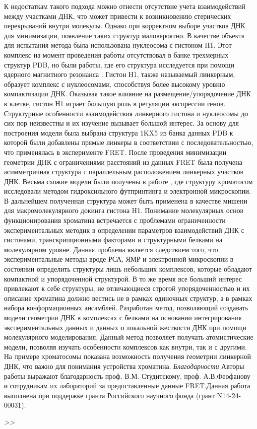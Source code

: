 К недостаткам такого подхода можно отнести отсутствие учета взаимодействий между участками ДНК, что может привести к возникновению стерических перекрываний внутри молекулы. Однако при корректном выборе участков ДНК для минимизации, появление таких структур маловероятно.
В качестве объекта для испытания метода была использована нуклеосома с гистоном H1. Этот комплекс на момент проведения работы отсутствовал в банке трехмерных структур PDB, но были работы, где его структура исследуется при помощи ядерного магнитного резонанса \cite{zhou_structural_2013}. Гистон Н1, также называемый линкерным, образует комплекс с нуклеосомами, способствуя более высокому уровню компактизации ДНК. Оказывая такое влияние на размещение/упорядочение   ДНК в клетке, гистон Н1 играет большую роль в регуляции экспрессии генов. Структурные особенности взаимодействия линкерного гистона и нуклеосомы до сих пор неизвестны и их изучение вызывает большой интерес. 
За основу для построения модели была выбрана структура 1KX5 \cite{davey_solvent_2002} из банка данных PDB к которой были добавлены прямые линкеры в соответствии с последовательностью, что применялась в эксперименте FRET.  После проведения минимизации геометрии ДНК с ограничениями расстояний из данных FRET была получена асимметричная структура с параллельным расположением линкерных участков ДНК. Весьма схожие модели были получены в работе \cite{syed_single-base_2010}, где структуру хроматосом исследовали методом гидроксильного футпринтинга и электронной микроскопии. В дальнейшем полученная структура может быть применена в качестве мишени для макромолекулярного докинга гистона H1. 
Понимание молекулярных основ функционирования хроматина встречается с проблемами ограниченности экспериментальных методик в определении параметров взаимодействий ДНК с гистонами, транскрипционными факторами и структурными белками на молекулярном уровне. Данная проблема является следствием того, что экспериментальные методы вроде РСА, ЯМР и электронной микроскопии в состоянии определить структуры лишь небольших комплексов, которые обладают компактной и упорядоченной структурой. В то же время все больший интерес привлекают к себе структуры, не отличающиеся строгой упорядоченностью и их описание хроматина должно вестись не в рамках одиночных структур, а в рамках набора конформационных ансамблей.
Разработан метод, позволяющий создавать модели геометрии ДНК в комплексах с белками на основании интегрирования экспериментальных данных и данных о локальной жесткости ДНК при помощи молекулярного моделирования. Данный метод позволяет получать атомистические модели, позволяя изучать особенности комплексов как внутри, так и с другими. На примере хроматосомы показана возможность получения геометрии линкерной ДНК, что важно для понимания устройства хроматина. 
\emph{Благодарности}
Авторы работы выражают благодарность проф. В.М. Студитскому, проф. А.В.Феофанову и сотрудникам их лабораторий за предоставленные данные FRET.Данная работа выполнена при поддержке гранта Российского научного фонда (грант N14-24-00031).

\textit{>>}
